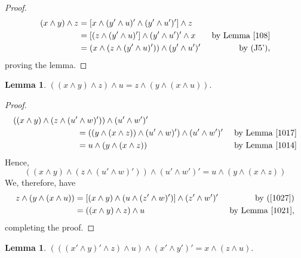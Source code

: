 \documentclass{amsart}
\theoremstyle{plain}
\newtheorem{lemma}[theorem]{Lemma}
\theoremstyle{problem}
\theoremstyle{definition}
\theoremstyle{remark}
\numberwithin{equation}{section}
\begin{document}
\begin{proof} 
 \begin{align*}                                                                                                
(x \land y) \land z &= [x \land (y' \land u)' \land (y' \land u')'] \land z\\
                             &= [(z \land (y' \land u)'] \land (y' \land u')' \land x 
                                            &\text{ by Lemma \ref{108}}\\ 
                              &=  (x \land (z \land (y' \land u)')) \land (y' \land u')' &\text{ by (J5')},
 \end{align*} 
proving the lemma.
\end{proof}

 
\begin{lemma} \label{1028}
$((x \land y) \land z) \land u = z \land (y \land (x \land u)). $ 
\end{lemma}

\begin{proof}
\begin{align*}                                               
((x \land y) \land (z \land (u' \land w)')) \land (u' \land w')'\\
          & \hspace{-3cm}= ((y \land (x \land z)) \land (u' \land w)') \land (u' \land w')'  &\text{ by Lemma \ref{1017}} \\
           & \hspace{-3cm}= u \land (y \land (x \land z)) &\text{by Lemma \ref{1014}}
\end{align*}
Hence,
\begin{equation} \label{1027}
 ((x \land y) \land (z \land (u' \land w)')) \land (u' \land w')' = u \land (y \land (x \land z))  
 \end{equation}
We, therefore, have
\begin{align*}
z \land (y \land (x \land u)) 
            &= [(x \land y) \land (u \land (z'  \land w)')] \land (z' \land w')'  &\text{ by (\ref{1027})}\\
               &= ((x \land y) \land z) \land u &\text{ by Lemma \ref{1021}},
\end{align*}
completing the proof.
\end{proof}

\begin{lemma}  \label{1019} 
 $(((x' \land y)' \land z) \land u) \land (x' \land y')' = x \land (z \land u).$  
\end{lemma}
\end{document}
